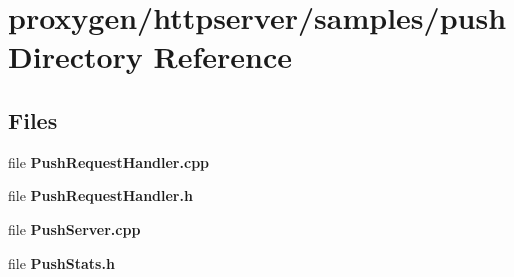 \section{proxygen/httpserver/samples/push Directory Reference}
\label{dir_d36b97fc963a546b3c776ee79e78f72c}
\subsection*{Files}
\begin{DoxyCompactItemize}
\item 
file {\bf Push\+Request\+Handler.\+cpp}
\item 
file {\bf Push\+Request\+Handler.\+h}
\item 
file {\bf Push\+Server.\+cpp}
\item 
file {\bf Push\+Stats.\+h}
\end{DoxyCompactItemize}
